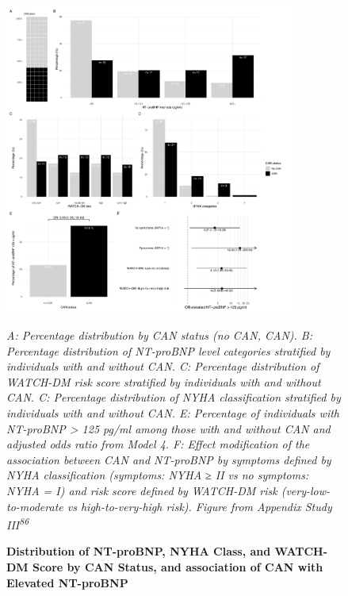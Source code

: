 \documentclass[
  letterpaper,
  headsepline=true,
  open=any]{scrbook}
\begin{document}

\begin{figure}

{\centering 

\includegraphics[width=0.85\textwidth,height=\textheight]{images/heart_failure_distribution_can_figure_2.pdf}

\emph{A: Percentage distribution by CAN status (no CAN, CAN). B:
Percentage distribution of NT-proBNP level categories stratified by
individuals with and without CAN. C: Percentage distribution of WATCH-DM
risk score stratified by individuals with and without CAN. C: Percentage
distribution of NYHA classification stratified by individuals with and
without CAN. E: Percentage of individuals with NT-proBNP \textgreater{}
125 pg/ml among those with and without CAN and adjusted odds ratio from
Model 4. F: Effect modification of the association between CAN and
NT-proBNP by symptoms defined by NYHA classification (symptoms: NYHA ≥
II vs no symptoms: NYHA = I) and risk score defined by WATCH-DM risk
(very-low-to-moderate vs high-to-very-high risk). Figure from Appendix
Study III\textsuperscript{86}}

}

\caption{\label{fig-CAN}\textbf{Distribution of NT-proBNP, NYHA Class,
and WATCH-DM Score by CAN Status, and association of CAN with Elevated
NT-proBNP}}

\end{figure}
\end{document}
